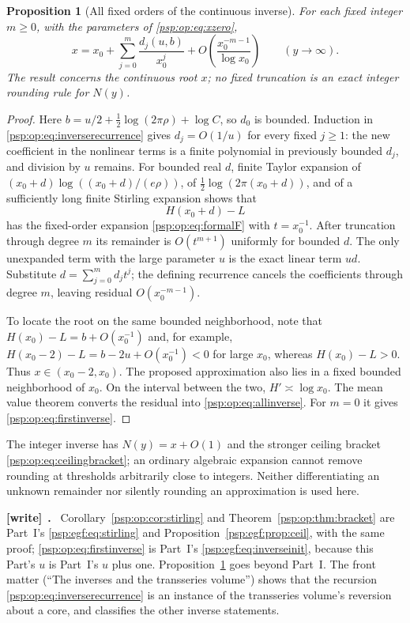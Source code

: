 \documentclass[11pt,letterpaper]{article}
\numberwithin{equation}{section}
\newtheorem{proposition}[theorem]{Proposition}
\theoremstyle{remark}\newtheorem{remark}[theorem]{Remark}
\newenvironment{writenote}[1][]{\par\smallskip\begingroup\small
 \noindent\textbf{[write]}\if\relax\detokenize{#1}\relax\else~\textbf{#1.}\fi\ }%
 {\par\endgroup\smallskip}
\begin{document}
\begin{proposition}[All fixed orders of the continuous inverse]\label{psp:op:prop:allinverse}
For each fixed integer $m\geq0$, with the parameters of
\eqref{psp:op:eq:xzero},
\begin{equation}\label{psp:op:eq:allinverse}
 x=x_0+\sum_{j=0}^{m}\frac{d_j(u,b)}{x_0^j}
    +O\!\left(\frac{x_0^{-m-1}}{\log x_0}\right)
 \qquad(y\to\infty).
\end{equation}
The result concerns the continuous root $x$; no fixed truncation is
an exact integer rounding rule for $N(y)$.
\end{proposition}
\begin{proof}
Here $b=u/2+\tfrac12\log(2\pi\rho)+\log C$, so $d_0$ is bounded.
Induction in \eqref{psp:op:eq:inverserecurrence} gives $d_j=O(1/u)$ for
every fixed $j\geq1$: the new coefficient in the nonlinear terms is
a finite polynomial in previously bounded $d_j$, and division by
$u$ remains. For bounded real $d$, finite Taylor expansion of
$(x_0+d)\log((x_0+d)/(e\rho))$, of
$\frac12\log(2\pi(x_0+d))$, and of a sufficiently long finite
Stirling expansion shows that
\[
 H(x_0+d)-L
\]
has the fixed-order expansion \eqref{psp:op:eq:formalF} with $t=x_0^{-1}$.
After truncation through degree $m$ its remainder is $O(t^{m+1})$
uniformly for bounded $d$. The only unexpanded term with the large
parameter $u$ is the exact linear term $ud$.
Substitute $d=\sum_{j=0}^m d_jt^j$; the defining recurrence cancels
the coefficients through degree $m$, leaving residual
$O(x_0^{-m-1})$.

To locate the root on the same bounded neighborhood, note that
$H(x_0)-L=b+O(x_0^{-1})$ and, for example,
$H(x_0-2)-L=b-2u+O(x_0^{-1})<0$ for large $x_0$,
whereas $H(x_0)-L>0$. Thus $x\in(x_0-2,x_0)$.
The proposed approximation also lies in a fixed bounded neighborhood
of $x_0$. On the interval between the two,
$H'\asymp\log x_0$. The mean value theorem converts the residual into
\eqref{psp:op:eq:allinverse}. For $m=0$ it gives \eqref{psp:op:eq:firstinverse}.
\end{proof}

The integer inverse has $N(y)=x+O(1)$ and the stronger ceiling bracket
\eqref{psp:op:eq:ceilingbracket}; an ordinary algebraic expansion cannot
remove rounding at thresholds arbitrarily close to integers.
Neither differentiating an unknown remainder nor silently rounding
an approximation is used here.
\begin{writenote}
Corollary~\ref{psp:op:cor:stirling} and Theorem~\ref{psp:op:thm:bracket} are Part~I's \eqref{psp:egf:eq:stirling} and Proposition~\ref{psp:egf:prop:ceil}, with the same proof; \eqref{psp:op:eq:firstinverse} is Part~I's \eqref{psp:egf:eq:inverseinit}, because this Part's $u$ is Part~I's $u$ plus one. Proposition~\ref{psp:op:prop:allinverse} goes beyond Part~I. The front matter (``The inverses and the transseries volume'') shows that the recursion \eqref{psp:op:eq:inverserecurrence} is an instance of the transseries volume's reversion about a core, and classifies the other inverse statements.
\end{writenote}
\end{document}
